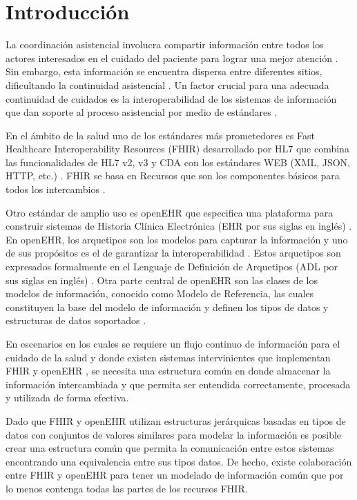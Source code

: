 \section{Introducción}

La coordinación asistencial involucra compartir información entre todos los actores interesados en el cuidado del paciente para lograr una mejor atención \cite{CareCoordination}. Sin embargo, esta información se encuentra dispersa entre diferentes sitios, dificultando la continuidad asistencial \cite{Indarte11}. Un factor crucial para una adecuada continuidad de cuidados es la interoperabilidad de los sistemas de información que dan soporte al proceso asistencial por medio de estándares \cite{OPS16}.

En el ámbito de la salud uno de los estándares más prometedores es Fast Healthcare Interoperability Resources (FHIR) desarrollado por HL7 que combina las funcionalidades de HL7 v2, v3 y CDA con los estándares WEB (XML, JSON, HTTP, etc.) \cite{FHIR}. FHIR se basa en Recursos que son los componentes básicos para todos los intercambios \cite{FHIROverview}.

Otro estándar de amplio uso es openEHR que especifica una plataforma para construir sistemas de Historia Clínica Electrónica (EHR por sus siglas en inglés) \cite{openEHR}. En openEHR, los arquetipos son los modelos para capturar la información y uno de sus propósitos es el de garantizar la interoperabilidad \cite{Bale00}. Estos arquetipos son expresados formalmente en el Lenguaje de Definición de Arquetipos (ADL por sus siglas en inglés) \cite{ADL}. Otra parte central de openEHR son las clases de los modelos de información, conocido como Modelo de Referencia, las cuales constituyen la base del modelo de información y definen los tipos de datos y estructuras de datos soportados \cite{RM}.

En escenarios en los cuales se requiere un flujo continuo de información para el cuidado de la salud y donde existen sistemas intervinientes que implementan FHIR y openEHR \cite{Lopez16}, se necesita una estructura común en donde almacenar la información intercambiada y que permita ser entendida correctamente, procesada y utilizada de forma efectiva.

Dado que FHIR y openEHR utilizan estructuras jerárquicas basadas en tipos de datos con conjuntos de valores similares para modelar la información es posible crear una estructura común que permita la comunicación entre estos sistemas encontrando una equivalencia entre sus tipos datos. De hecho, existe colaboración entre FHIR y openEHR \cite{Collaboration} para tener un modelado de información común que por lo menos contenga todas las partes de los recursos FHIR.
